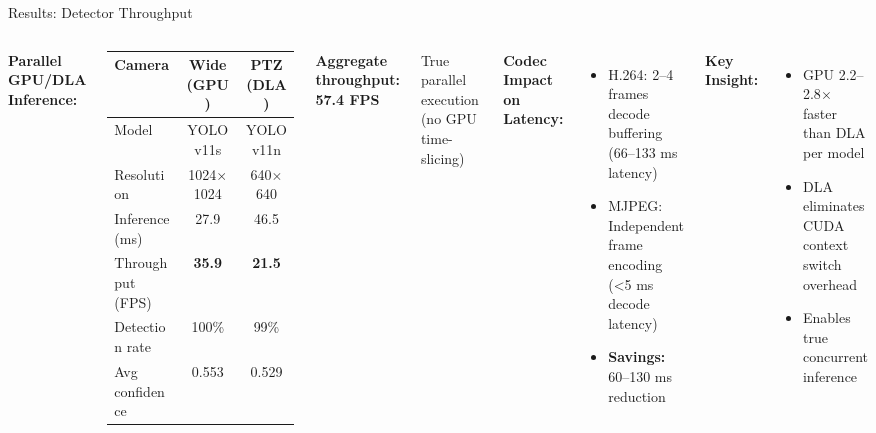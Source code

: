 \documentclass[aspectratio=169, 10pt]{beamer}
\begin{document}
\begin{frame}{Results: Detector Throughput}
\begin{columns}[T]
\textbf{Parallel GPU/DLA Inference:}

\vspace{0.3em}
\begin{table}[h]
\centering
\scriptsize
\begin{tabular}{@{}lcc@{}}
\toprule
\textbf{Camera} & \textbf{Wide (GPU)} & \textbf{PTZ (DLA)} \\
\midrule
Model & YOLOv11s & YOLOv11n \\
Resolution & 1024$\times$1024 & 640$\times$640 \\
Inference (ms) & 27.9 & 46.5 \\
Throughput (FPS) & \textcolor{Atlantic}{\textbf{35.9}} & \textcolor{Atlantic}{\textbf{21.5}} \\
Detection rate & 100\% & 99\% \\
Avg confidence & 0.553 & 0.529 \\
\bottomrule
\end{tabular}
\end{table}

\vspace{0.5em}
\textbf{Aggregate throughput:} \textcolor{Rose}{\textbf{57.4 FPS}}

\vspace{0.3em}
True parallel execution (no GPU time-slicing)

\textbf{Codec Impact on Latency:}

\vspace{0.3em}
\begin{itemize}
\item \alert{H.264:} 2--4 frames decode buffering\\(66--133 ms latency)
\item \alert{MJPEG:} Independent frame encoding\\(<5 ms decode latency)
\item \textbf{Savings:} 60--130 ms reduction
\end{itemize}

\vspace{0.5em}
\textbf{Key Insight:}
\begin{itemize}
\item GPU 2.2--2.8$\times$ faster than DLA per model
\item DLA eliminates CUDA context switch overhead
\item Enables true concurrent inference
\end{itemize}
\end{columns}
\end{frame}
\end{document}
